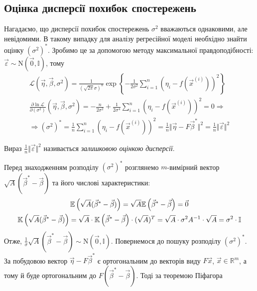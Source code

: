 \subsection{Оцінка дисперсії похибок спостережень}
Нагадаємо, що дисперсії похибок спостережень $\sigma^2$ вважаються однаковими, але невідомими. В такому випадку для аналізу регресійної моделі
необхідно знайти оцінку $(\sigma^2)^*$. Зробимо це за допомогою методу максимальної правдоподібності: $\vec{\varepsilon} \sim \mathrm{N}(\vec{0}, \mathbb{I})$,
тому
\begin{gather*}
    \mathcal{L}(\vec{\eta}, \vec{\beta}, \sigma^2) = \frac{1}{(\sqrt{2\pi} \sigma)^n} \exp \left\{ 
        -\frac{1}{2\sigma^2} \sum\limits_{i=1}^n \left(\eta_i - f\left(\vec{x}^{(i)}\right)\right)^2
    \right\} \\
    \frac{\partial \ln \mathcal{L}}{\partial (\sigma^2)} (\vec{\eta}, \vec{\beta}, \sigma^2) 
    = -\frac{n}{2\sigma^2} + \frac{1}{2\sigma^4} \sum\limits_{i=1}^n \left(\eta_i - f\left(\vec{x}^{(i)}\right)\right)^2 = 0 \Rightarrow \\ \Rightarrow
    (\sigma^2)^* = \frac{1}{n} \sum\limits_{i=1}^n \left(\eta_i - f\left(\vec{x}^{(i)}\right)\right)^2 =
    \frac{1}{n} \Vert \vec{\eta} - F \vec{\beta}^* \Vert^2 = \frac{1}{n} \Vert \vec{\varepsilon}\Vert^2
\end{gather*}
\begin{definition}
    Вираз $\frac{1}{n} \Vert \vec{\varepsilon}\Vert^2$ називається \emph{залишковою оцінкою дисперсії}.
\end{definition}
Перед знаходженням розподілу $(\sigma^2)^*$ розглянемо $m$-вимірний вектор $\sqrt{A}(\vec{\beta}^* - \vec{\beta})$ та його числові характеристики:
\begin{gather*}
    \mathbb{E} \left(\sqrt{A}(\vec{\beta}^* - \vec{\beta})\right) = \sqrt{A} \mathbb{E} \left(\vec{\beta}^* - \vec{\beta}\right) = \vec{0} \\
    \mathbb{K} \left(\sqrt{A}(\vec{\beta}^* - \vec{\beta})\right) = \sqrt{A} \cdot \mathbb{K} \left(\vec{\beta}^* - \vec{\beta}\right) \cdot (\sqrt{A})^T = 
    \sqrt{A} \cdot \sigma^2 A^{-1} \cdot \sqrt{A} = \sigma^2 \cdot \mathbb{I}
\end{gather*}
Отже, $\frac{1}{\sigma} \sqrt{A}(\vec{\beta}^* - \vec{\beta}) \sim \mathrm{N}(\vec{0}, \mathbb{I})$. Повернемося до пошуку розподілу $(\sigma^2)^*$.
За побудовою вектор $\vec{\eta} - F \vec{\beta}^*$ є ортогональним до векторів виду $F\vec{x}$, $\vec{x} \in \mathbb{R}^m$, а тому й буде ортогональним до 
$F(\vec{\beta}^* - \vec{\beta})$. Тоді за теоремою Піфагора
